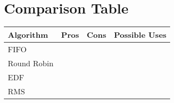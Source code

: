 \documentclass[./report.tex]{subfiles}
\begin{document}
\newpage
\section{Comparison Table}

\begin{tabular}{|m{8em}|m{12em}|m{12em}|m{12em}|} 
	\hline 
	\textbf{Algorithm} & \textbf{Pros} & \textbf{Cons} & \textbf{Possible Uses} \\ 
	\hline
	FIFO &  &  & \\
	\hline
	Round Robin &  &  & \\
	\hline
	EDF &  &  & \\
	\hline
	RMS &  &  & \\
	\hline
\end{tabular}
\end{document}

